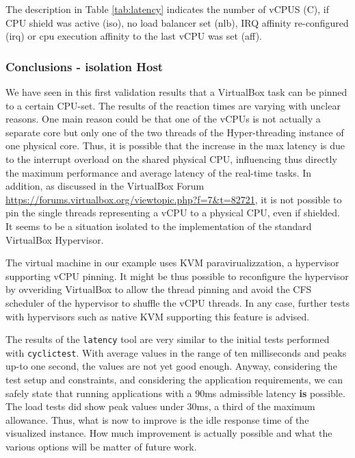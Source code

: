 \documentclass[]{scrartcl}
\begin{document}
The description in Table \ref{tab:latency} indicates the number of vCPUS (C), if CPU shield was active (iso), no load balancer set (nlb), IRQ affinity re-configured (irq) or cpu execution affinity to the last vCPU was set (aff).

\subsubsection{Conclusions - isolation Host}
\label{sec:conciso}

We have seen in this first validation results that a VirtualBox task can be pinned to a certain CPU-set. The results of the reaction times are varying with unclear reasons. 
One main reason could be that one of the vCPUs is not actually a separate core but only one of the two threads of the Hyper-threading instance of one physical core. 
Thus, it is possible that the increase in the max latency is due to the interrupt overload on the shared physical CPU, influencing thus directly the maximum performance and average latency of the real-time tasks. In addition, as discussed in the VirtualBox Forum \url{https://forums.virtualbox.org/viewtopic.php?f=7&t=82721}, it is not possible to pin the single threads representing a vCPU to a physical CPU, even if shielded. It seems to be a situation isolated to the implementation of the standard VirtualBox Hypervisor. 

The virtual machine in our example uses KVM paravirualizzation, a hypervisor supporting vCPU pinning. It might be thus possible to reconfigure the hypervisor by ovveriding VirtualBox to allow the thread pinning and avoid the CFS scheduler of the hypervisor to shuffle the vCPU threads. In any case, further tests with hypervisors such as native KVM supporting this feature is advised.

The results of the \texttt{latency} tool are very similar to the initial tests performed with \texttt{cyclictest}. With average values in the range of ten milliseconds and peaks up-to one second, the values are not yet good enough. 
Anyway, considering the test setup and constraints, and considering the application requirements, we can safely state that running applications with a 90ms admissible latency \textbf{is} possible. The load tests did show peak values under 30ms, a third of the maximum allowance. 
Thus, what is now to improve is the idle response time of the visualized instance. How much improvement is actually possible and what the various options will be matter of future work.
\end{document}
